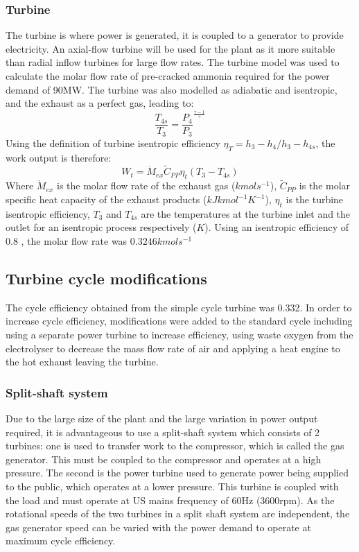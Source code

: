 \documentclass[11pt, oneside]{article}
\begin{document}
\subsubsection{Turbine} \label{ssec:turbine}
The turbine is where power is generated, it is coupled to a generator to provide electricity. An axial-flow turbine will be used for the plant as it more suitable than radial inflow turbines for large flow rates. The turbine model was used to calculate the molar flow rate of pre-cracked ammonia required for the power demand of 90MW. The turbine was also modelled as adiabatic and isentropic, and the exhaust as a perfect gas, leading to: 
\begin{equation}
\frac{T_{4s}}{T_{3}} = \frac{P_4}{P_3}^{\frac{\gamma -1}{\gamma}}
\end{equation}
Using the definition of turbine isentropic efficiency $\eta_T = {h_3 - h_4}/{h_3 - h_{4s}}$, the work output is therefore:
\begin{equation}
W_t = \dot{M}_{ex} \tilde{C}_{PP} \eta_t  (T_3 - T_{4s})
\end{equation}
Where $\dot{M}_{ex}$ is the molar flow rate of the exhaust gas ($kmol s^{-1}$), $\tilde{C}_{PP}$ is the molar specific heat capacity of the exhaust products ($kJ kmol^{-1} K^{-1}$), $\eta_t$ is the turbine isentropic efficiency, $T_3$ and $T_{4s}$ are the temperatures at the turbine inlet and the outlet for an isentropic process respectively ($K$). Using an isentropic efficiency of 0.8 \cite{boyce}, the molar flow rate was $0.3246kmol s^{-1}$

\subsection{Turbine cycle modifications }
The cycle efficiency obtained from the simple cycle turbine was 0.332. In order to increase cycle efficiency, modifications were added to the standard cycle including using a separate power turbine to increase efficiency, using waste oxygen from the electrolyser to decrease the mass flow rate of air and applying a heat engine to the hot exhaust leaving the turbine. 

\subsubsection{Split-shaft system}
Due to the large size of the plant and the large variation in power output required, it is advantageous to use a split-shaft system which consists of 2 turbines: one is used to transfer work to the compressor, which is called the gas generator. This must be coupled to the compressor and operates at a high pressure. The second is the power turbine used to generate power being supplied to the public, which operates at a lower pressure. This turbine is coupled with the load and must operate at US mains frequency of 60Hz (3600rpm). As the rotational speeds of the two turbines in a split shaft system are independent, the gas generator speed can be varied with the power demand to operate at maximum cycle efficiency. \cite{thermonotes} %
\end{document}
